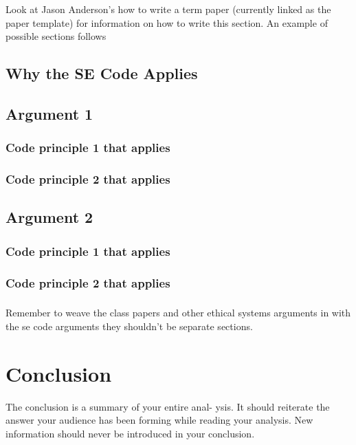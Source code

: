 \documentclass[11pt]{article}
\begin{document}
\begin{multicols}{2}
Look at Jason Anderson's how to write a term paper (currently linked as the paper template) for information on how to write this section.  An example of possible sections follows
\subsection{Why the SE Code Applies}
\subsection{Argument 1}
\subsubsection{Code principle 1 that applies}
\subsubsection{Code principle 2 that applies}
\subsection{Argument 2}
\subsubsection{Code principle 1 that applies}
\subsubsection{Code principle 2 that applies}

\subsubsection*{}
Remember to weave the class papers and other ethical systems arguments in with the se code arguments they shouldn't be separate sections.  

\section{Conclusion}
The conclusion is a summary of your entire anal- ysis. It should reiterate the answer your audience has been forming while reading your analysis. New information should never be introduced in your conclusion. \cite{texTemp}

\end{multicols}
\newpage

\nocite{*}




\end{document}
